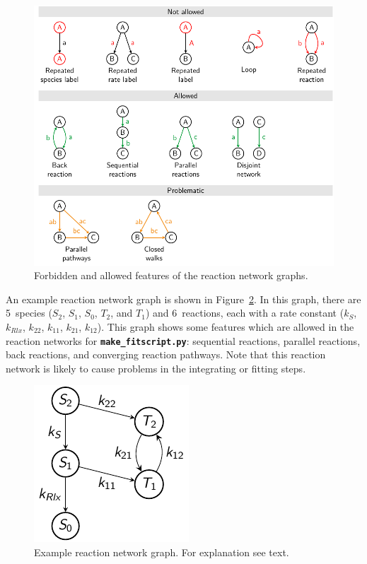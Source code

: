 \documentclass[a4paper,10pt,DIV=15,openany,twoside=false]{scrbook}
\newcommand{\ttt}[1]{\textbf{\texttt{#1}}}
\begin{document}
\begin{figure}[htb]
  \centering
  \includegraphics[scale=1]{img/reaction_networks/allowed_notallowed.pdf}
  \caption{Forbidden and allowed features of the reaction network graphs.}
  \label{fig:graph_restrictions}
\end{figure}

An example reaction network graph is shown in Figure~\ref{fig:example_graph}.
In this graph, there are 5~species ($S_2$, $S_1$, $S_0$, $T_2$, and $T_1$) and 6~reactions, each with a rate constant ($k_S$, $k_{Rlx}$, $k_{22}$, $k_{11}$, $k_{21}$, $k_{12}$).
This graph shows some features which are allowed in the reaction networks for \ttt{make\_fitscript.py}: sequential reactions, parallel reactions, back reactions, and converging reaction pathways.
Note that this reaction network is likely to cause problems in the integrating or fitting steps.

\begin{figure}[htb]
  \centering
  \includegraphics[scale=1]{img/reaction_networks/example_graph.pdf}
  \caption{Example reaction network graph. For explanation see text.}
  \label{fig:example_graph}
\end{figure}
\end{document}
